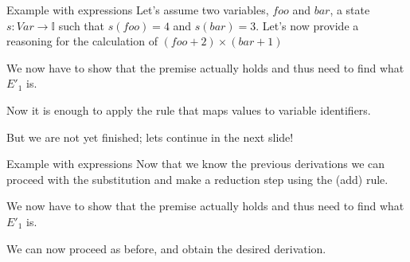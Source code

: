 \documentclass[aspectratio=169]{beamer}
\begin{document}
\begin{slide}{Example with expressions}
\small
Let's assume two variables, $foo$ and $bar$, a state $s : Var \to \mathbb{I}$ such that $s(foo) = 4$ and $s(bar) = 3$. Let's now provide a reasoning for the calculation of $(foo + 2) \times (bar + 1)$

\begin{prooftree}
\end{prooftree}

We now have to show that the premise actually holds and thus need to find what $E'_1$ is.  

\begin{prooftree}
\end{prooftree}

Now it is enough to apply the rule that maps values to variable identifiers.

\begin{prooftree}
\end{prooftree}
 But we are not yet finished; lets continue in the next slide!
\end{slide}

\begin{slide}{Example with expressions}
\small
Now that we know the previous derivations we can proceed with the substitution and make a reduction step using the (add) rule.
\begin{prooftree}
\end{prooftree}

We now have to show that the premise actually holds and thus need to find what $E'_1$ is.  

\begin{prooftree}
\end{prooftree}

We can now proceed as before, and obtain the desired derivation.

\end{slide}
\end{document}
